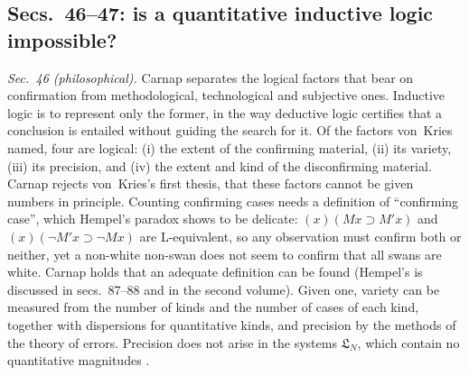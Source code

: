 \subsection*{Secs.~46--47: is a quantitative inductive logic impossible?}

\emph{Sec.~46 (philosophical).} Carnap separates the logical factors
that bear on confirmation from methodological, technological and
subjective ones. Inductive logic is to represent only the former, in
the way deductive logic certifies that a conclusion is entailed without
guiding the search for it. Of the factors von~Kries named, four are
logical: (i) the extent of the confirming material, (ii) its variety,
(iii) its precision, and (iv) the extent and kind of the disconfirming
material. Carnap rejects von~Kries's first thesis, that these factors
cannot be given numbers in principle. Counting confirming cases needs a
definition of ``confirming case'', which Hempel's paradox shows to be
delicate: \((x)(Mx\supset M'x)\) and \((x)(\neg M'x\supset\neg Mx)\) are
L-equivalent, so any observation must confirm both or neither, yet a
non-white non-swan does not seem to confirm that all swans are white.
Carnap holds that an adequate definition can be found (Hempel's is
discussed in secs.~87--88 and in the second volume). Given one,
variety can be measured from the number of kinds and the number of
cases of each kind, together with dispersions for quantitative kinds,
and precision by the methods of the theory of errors. Precision does not
arise in the systems \(\mathfrak L_N\), which contain no quantitative
magnitudes \cite[sec.~46, pp.~219--226]{Carnap1950Probability}.

